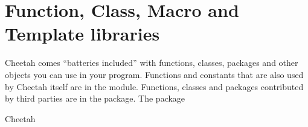 
\section{Function, Class, Macro and Template libraries}

Cheetah comes ``batteries included'' with functions, classes, packages and
other objects you can use in your program.  Functions and constants that are
also used by Cheetah itself are in the  module.
Functions, classes and packages contributed by third parties are in the
 package.  The  package

Cheetah 
